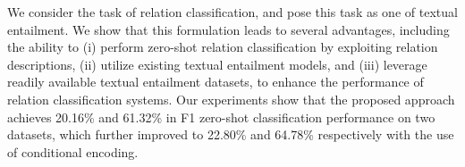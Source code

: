 We consider the task of relation classification, and pose this task as one of textual entailment. We show that this formulation leads to several advantages, including the ability to (i) perform zero-shot relation classification by exploiting relation descriptions, (ii) utilize existing textual entailment models, and (iii) leverage readily available textual entailment datasets, to enhance the performance of relation classification systems. Our experiments show that the proposed approach achieves 20.16\% and 61.32\% in F1 zero-shot classification performance on two datasets, which further improved to 22.80\% and 64.78\% respectively with the use of conditional encoding.

